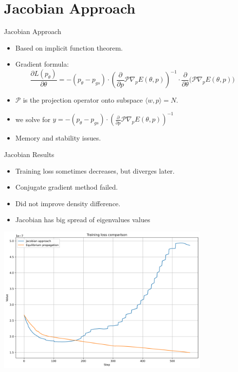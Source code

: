 \documentclass{beamer}
\begin{document}
\section{Jacobian Approach}
\begin{frame}{Jacobian Approach}
  \begin{itemize}
    \item Based on implicit function theorem.
    \item Gradient formula:
    \[
      \frac{\partial L(p_{\theta})}{\partial \theta} = -(p_{\theta}-p_{gs}) \cdot \left(\frac{\partial}{\partial p}\mathcal{P}\nabla_p E(\theta, p)\right)^{-1} \cdot \frac{\partial}{\partial \theta}\big(\mathcal{P}\nabla_p E(\theta, p)\big)
    \]
    \item  $\mathcal{P}$ is the projection operator onto subspace $\langle w,p \rangle = N$.
    \item we solve for $y = -(p_{\theta}-p_{gs}) \cdot \left(\frac{\partial}{\partial p}\mathcal{P}\nabla_p E(\theta, p)\right)^{-1}$
    \item Memory and stability issues.
  \end{itemize}
\end{frame}

\begin{frame}{Jacobian Results}
  \begin{itemize}
    \item Training loss sometimes decreases, but diverges later.
    \item Conjugate gradient method failed.
    \item Did not improve density difference.
    \item Jacobian has big spread of eigenvalues values
  \end{itemize}
\end{frame}

\begin{frame}
 \begin{center}
    \includegraphics[width=0.8\textwidth]{images/loss_comparison.png} %
  \end{center}
\end{frame}
\end{document}
